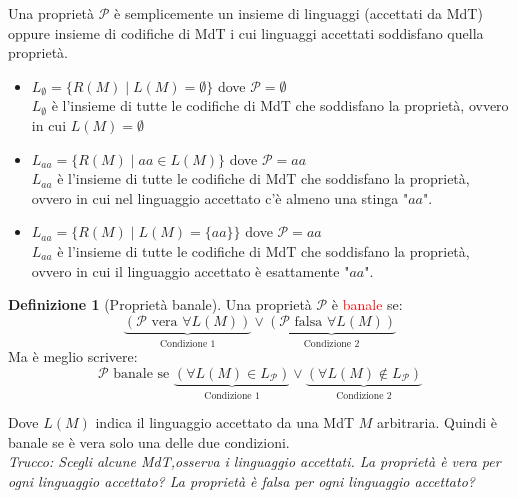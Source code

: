 \documentclass{article}  %
\theoremstyle{definition}
\newtheorem{definition}{Definizione}[section]
\begin{document}
\begin{osservazioni}[Osservazioni]
	Una proprietà $\mathscr{P}$ è semplicemente un insieme di linguaggi (accettati da MdT) oppure insieme di codifiche di MdT i cui linguaggi accettati
	soddisfano quella proprietà.
	\footnotesize %
	\begin{itemize}
		\item $L_{\emptyset}=\{R(M) \mid L(M) = \emptyset\}$ dove $\mathscr{P}=\emptyset$ \\
		      $L_{\emptyset}$ è l'insieme di tutte le codifiche di MdT che soddisfano la proprietà, ovvero in cui $L(M)=\emptyset$
		\item $L_{aa}=\{R(M) \mid aa \in L(M)\}$ dove $\mathscr{P}=aa$ \\
		      $L_{aa}$ è l'insieme di tutte le codifiche di MdT che soddisfano la proprietà, ovvero in cui nel linguaggio accettato
		      c'è almeno una stinga "$aa$".
		\item $L_{aa}=\{R(M) \mid L(M)=\{aa\}\}$ dove $\mathscr{P}=aa$ \\
		      $L_{aa}$ è l'insieme di tutte le codifiche di MdT che soddisfano la proprietà, ovvero in cui il linguaggio accettato
		      è esattamente "$aa$".
	\end{itemize}
\end{osservazioni}
\begin{definition}[Proprietà banale]
	Una proprietà $\mathscr{P}$ è \textcolor{red}{banale} se:
	\[
		\underbrace{(\mathscr{P} \text{ vera } \forall{L(M)})}_{\text{Condizione 1}}
		\lor
		\underbrace{(\mathscr{P} \text{ falsa } \forall{L(M)})}_{\text{Condizione 2}}
	\]
	Ma è meglio scrivere:
	\[
		\mathscr{P} \text{ banale se }
		\underbrace{(\forall{L(M)}\in L_{\mathscr{P}})}_{\text{Condizione 1}}
		\lor
		\underbrace{(\forall{L(M)}\notin L_{\mathscr{P}})}_{\text{Condizione 2}}
	\]

	Dove $L(M)$ indica il linguaggio accettato da una MdT $M$ arbitraria. Quindi è banale se è vera solo una delle due condizioni. \\
	\textit{Trucco: Scegli alcune MdT,osserva i linguaggio accettati. La proprietà è vera per ogni linguaggio accettato?
		La proprietà è falsa per ogni linguaggio accettato?}
\end{definition}
\end{document}
